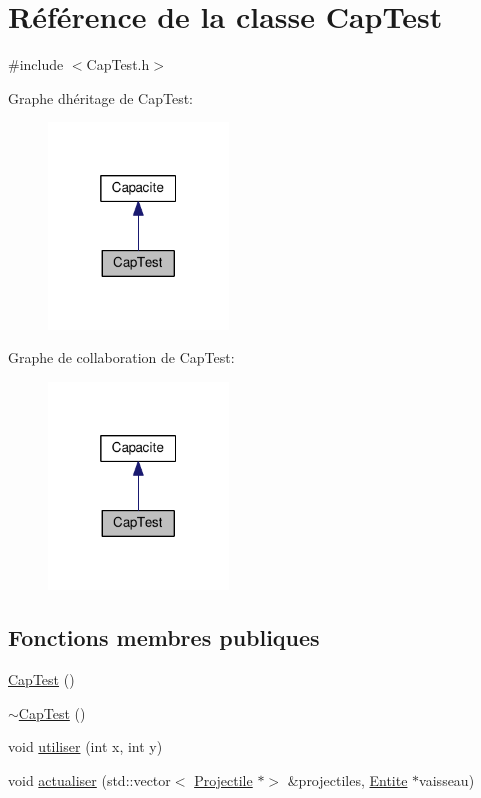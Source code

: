 \hypertarget{class_cap_test}{}\section{Référence de la classe Cap\+Test}
\label{class_cap_test}


{\ttfamily \#include $<$Cap\+Test.\+h$>$}



Graphe d\textquotesingle{}héritage de Cap\+Test\+:
\nopagebreak
\begin{figure}[H]
\begin{center}
\leavevmode
\includegraphics[width=136pt]{class_cap_test__inherit__graph}
\end{center}
\end{figure}


Graphe de collaboration de Cap\+Test\+:
\nopagebreak
\begin{figure}[H]
\begin{center}
\leavevmode
\includegraphics[width=136pt]{class_cap_test__coll__graph}
\end{center}
\end{figure}
\subsection*{Fonctions membres publiques}
\begin{DoxyCompactItemize}
\item 
\hyperlink{class_cap_test_a5f6d4b172a6a40f974b3f7414e3f06e5}{Cap\+Test} ()
\item 
\hyperlink{class_cap_test_a92687aa212347d1738e7736cb107d03b}{$\sim$\+Cap\+Test} ()
\item 
void \hyperlink{class_cap_test_af85984f6d9330e5527feff1a62ee4242}{utiliser} (int x, int y)
\item 
void \hyperlink{class_cap_test_a5742770894ff765e2785f82aab88b223}{actualiser} (std\+::vector$<$ \hyperlink{class_projectile}{Projectile} $\ast$$>$ \&projectiles, \hyperlink{class_entite}{Entite} $\ast$vaisseau)
\end{DoxyCompactItemize}
